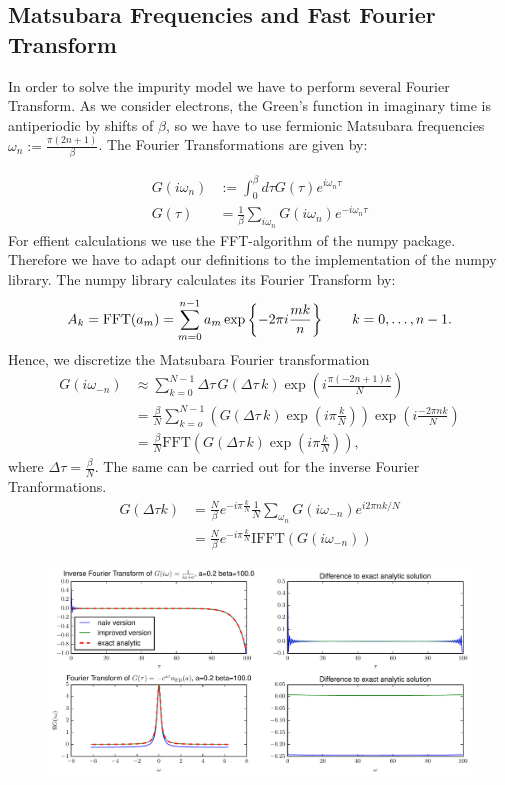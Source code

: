 \begin{appendix}
\section{Matsubara Frequencies and Fast Fourier Transform}
In order to solve the impurity model we have to perform several Fourier Transform.
As we consider electrons, the Green's function in imaginary time is antiperiodic by shifts of $\beta$, so we have to use fermionic Matsubara frequencies $ω_n:=\frac{π(2n+1)}{β}$.
The Fourier Transformations are given by:

\begin{align}
  G(i ω_n) &:= \int_0^β dτ G(τ) e^{i ω_n τ}\\
  G(τ) &= \frac{1}{β} \sum_{i ω_n} G(i ω_n) e^{-i ω_n τ}
\end{align}
For effient calculations we use the FFT-algorithm of the numpy package. Therefore we have to adapt our definitions to the implementation of the numpy library. The numpy library calculates its Fourier Transform by:
\begin{equation}
  A_k = \mathrm{FFT}(a_m) =  \sum_{m=0}^{n-1} a_m \exp\left\{-2\pi i{mk \over n}\right\}
   \qquad k = 0,\ldots,n-1.
\end{equation}
Hence, we discretize the Matsubara Fourier transformation
\begin{align}
  G(i ω_{-n}) &\approx \sum_{k=0}^{N-1} \Delta τ \, G(\Delta τ \, k) \exp{\left(i \frac{π (-2n+1)k}{N}\right)}\\
          &=\frac{\beta}{N} \sum_{k=o}^{N-1} \left( G(\Delta τ \, k)\exp{\left(i π \frac{k}{N}\right)}  \right)  \exp{\left(i \frac{-2 π n k}{N}\right)}\\
	  &= \frac{\beta}{N} \mathrm{FFT}\left( G(\Delta τ \, k)\exp{\left(i π \frac{k}{N}\right)}\right), \label{eq:MFFT}
\end{align}
where $\Delta τ = \frac{\beta}{N}$.
The same can be carried out for the inverse Fourier Tranformations.
\begin{align}
	G(\Delta τ k) &= \frac{N}{β} e^{-i π \frac{k}{N}}\frac{1}{N}\sum_{ω_n}G(i ω_{-n}) e^{i 2π n k/N}\\
	&= \frac{N}{β} e^{-i π \frac{k}{N}}\mathrm{IFFT}(G(iω_{-n})) \label{eq:IMFFT}
\end{align}
\begin{figure}[h]
	\centering
	\includegraphics[width=\textwidth]{Matsubara_Fourier_fig}

\end{figure}
\end{appendix}
